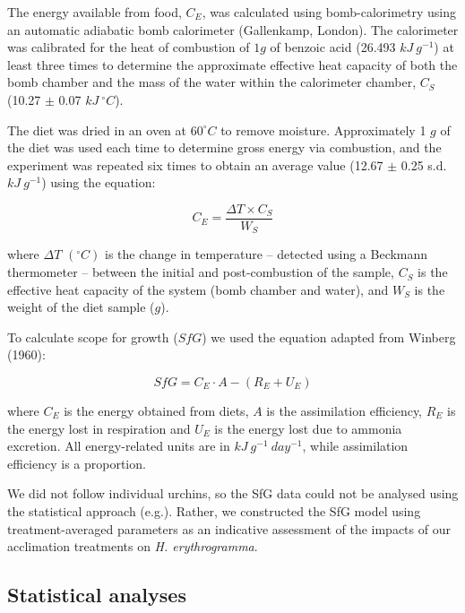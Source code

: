 \documentclass[oneside, a4paper]{memoir}
\theoremstyle{definition}
\theoremstyle{definition}
\theoremstyle{definition}
\theoremstyle{remark}
\begin{document}
The energy available from food, \(C_E\), was calculated using
bomb-calorimetry using an automatic adiabatic bomb calorimeter
(Gallenkamp, London). The calorimeter was calibrated for the heat of
combustion of \(1 g\) of benzoic acid (26.493 \(kJ\ g^{−1}\)) at least
three times to determine the approximate effective heat capacity of both
the bomb chamber and the mass of the water within the calorimeter
chamber, \(C_S\) (10.27 \(\pm\) 0.07 \(kJ\ ^{\circ}C\)).

The diet was dried in an oven at \(60^{\circ}C\) to remove moisture.
Approximately 1 \(g\) of the diet was used each time to determine gross
energy via combustion, and the experiment was repeated six times to
obtain an average value (12.67 \(\pm\) 0.25 s.d. \(kJ\ g^{-1}\)) using
the equation:

\begin{equation}
  C_E = \frac{\Delta T \times C_S}{W_S}
  \label{eq:ce}
\end{equation}

where \(\Delta T\) \((^{\circ}C)\) is the change in temperature --
detected using a Beckmann thermometer -- between the initial and
post-combustion of the sample, \(C_S\) is the effective heat capacity of
the system (bomb chamber and water), and \(W_S\) is the weight of the
diet sample (\(g\)).

To calculate scope for growth (\(SfG\)) we used the equation adapted
from Winberg (1960):

\begin{equation}
  SfG = C_E \cdot A - (R_E + U_E)
  \label{eq:sfg}
\end{equation}

where \(C_E\) is the energy obtained from diets, \(A\) is the
assimilation efficiency, \(R_E\) is the energy lost in respiration and
\(U_E\) is the energy lost due to ammonia excretion. All energy-related
units are in \(kJ\ g^{-1}\ day^{-1}\), while assimilation efficiency is
a proportion.

We did not follow individual urchins, so the SfG data could not be
analysed using the statistical approach (e.g.). Rather, we constructed
the SfG model using treatment-averaged parameters as an indicative
assessment of the impacts of our acclimation treatments on \emph{H.
erythrogramma}.

\subsection{Statistical analyses}\label{statistical-analyses}
\end{document}
